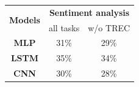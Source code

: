 \begin{table}[!b]
	\begin{minipage}[t]{.40\textwidth}
	\vspace{-0.1in}
	\centering
	\begin{tabular}{c c c}
		\toprule
		\multirow{2}{*}{{\bf Models}} & \multicolumn{2}{c}{\bf Sentiment analysis} \\
		& all tasks & w/o TREC \\
		\midrule
		{\bf MLP}  & 31\% & 29\% \\
		{\bf LSTM} & 35\% & 34\% \\
		{\bf CNN}  & 30\% & 28\% \\
		\bottomrule
		\end{tabular}
	\vspace{0.1in}
	\label{tab:taskonomy}
\end{minipage}
\end{table}

